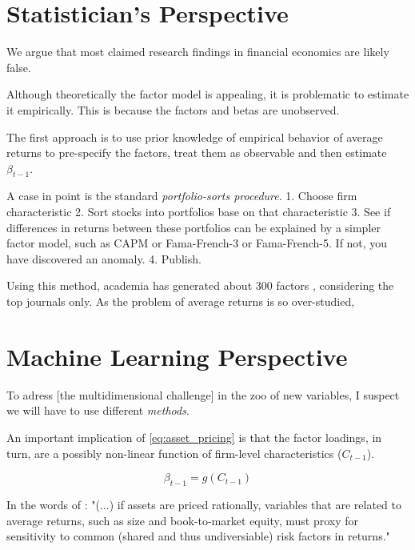 	
	\section{Statistician's Perspective} 
		
		\epigraph{We argue that most claimed research findings in financial economics are likely false. }{\cite{harvey2016and}}
		
		Although theoretically the factor model is appealing, it is problematic to estimate it empirically. This is because the factors and betas are unobserved. 
		
		The first approach is to use prior knowledge of empirical behavior of average returns to pre-specify the factors, treat them as observable and then estimate $\beta_{t-1}$.
		
		A case in point is the standard \textit{portfolio-sorts procedure}. 
		1. Choose firm characteristic 
		2. Sort stocks into portfolios base on that characteristic \citep{fama1993common}
		3. See if differences in returns between these portfolios can be explained by a simpler factor model, such as CAPM or Fama-French-3 or Fama-French-5. If not, you have discovered an anomaly. 
		4. Publish.
		
		Using this method, academia has generated about 300 factors \citep{harvey2016and}, considering the top journals only. As the problem of average returns is so over-studied, 
	
	\section{Machine Learning Perspective}
	
		\epigraph{To adress [the multidimensional challenge] in the zoo of new variables, I suspect we will have to use different \textit{methods}.}{\cite{cochrane2011presidential}}
		
		An important implication of \ref{eq:asset_pricing} is that the factor loadings, in turn, are a possibly non-linear function of firm-level characteristics ($C_{t-1}$). 
		
		\begin{equation}
		\beta_{t-1}= g(C_{t-1})\label{eq:characteristics_as_proxies}
		\end{equation}
		
		In the words of \cite{fama1993common}: "(...) if assets are priced rationally, variables that are
		related to average returns, such as size and book-to-market equity, must proxy for
		sensitivity to common (shared and thus undiversiable) risk factors in returns." 	
		
